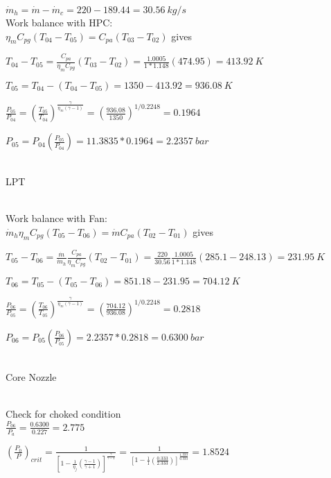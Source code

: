 \documentclass{article}
\begin{document}
$\dot{m}_h=\dot{m}-\dot{m}_c=220-189.44=30.56\ kg/s$
\\

Work balance with HPC:
\\

$\eta_m C_{pg}(T_{04}-T_{05})=C_{pa}(T_{03}-T_{02})$ gives

$T_{04}-T_{05}=\frac{C_{pa}}{\eta_m C_{pg}}(T_{03}-T_{02})=\frac{1.0005}{1*1.148}(474.95)=413.92\ K$

$T_{05}=T_{04}-(T_{04}-T_{05})=1350-413.92=936.08\ K$

$\frac{P_{05}}{P_{04}}=(\frac{T_{05}}{T_{04}})^{\frac{\gamma}{\eta_{\infty}(\gamma-1)}}
=(\frac{936.08}{1350})^{1/0.2248}=0.1964$

$P_{05}=P_{04}(\frac{P_{05}}{P_{04}})=11.3835*0.1964=2.2357\ bar$
\\
\\

	\begin{Large}
		LPT
	\end{Large}
\\

Work balance with Fan:
\\

$\dot{m}_h \eta_m C_{pg}(T_{05}-T_{06})=\dot{m} C_{pa}(T_{02}-T_{01})$ gives

$T_{05}-T_{06}=\frac{\dot{m}}{\dot{m}_h}\frac{C_{pa}}{\eta_m C_{pg}}(T_{02}-T_{01})=\frac{220}{30.56}\frac{1.0005}{1*1.148}(285.1-248.13)=231.95\ K$

$T_{06}=T_{05}-(T_{05}-T_{06})=851.18-231.95=704.12\ K$

$\frac{P_{06}}{P_{05}}=(\frac{T_{06}}{T_{05}})^{\frac{\gamma}{\eta_{\infty}(\gamma-1)}}
=(\frac{704.12}{936.08})^{1/0.2248}=0.2818$

$P_{06}=P_{05}(\frac{P_{06}}{P_{05}})=2.2357*0.2818=0.6300\ bar$
\\
\\

	\begin{Large}
		Core Nozzle
	\end{Large}
\\

Check for choked condition
\\

$\frac{P_{06}}{P_a}=\frac{0.6300}{0.227}=2.775$

$(\frac{P_0}{P})_{crit}=\frac{1}{[1-\frac{1}{\eta_j}(\frac{\gamma-1}{\gamma+1})]^{\frac{\gamma}{\gamma-1}}}
=\frac{1}{[1-\frac{1}{1}(\frac{0.333}{2.333})]^{\frac{1.333}{0.333}}}=1.8524$
\end{document}
